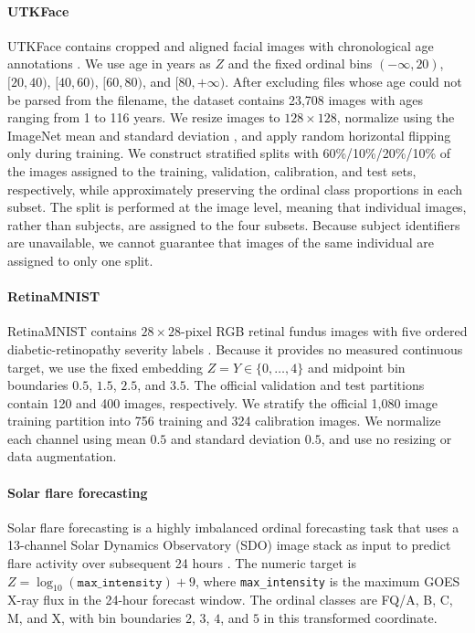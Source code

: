 \documentclass[conference]{IEEEtran}
\begin{document}
\paragraph{UTKFace}
UTKFace contains cropped and aligned facial images with chronological age annotations \cite{utkface-zhifei2017cvpr}. We use age in years as $Z$ and the fixed ordinal bins $(-\infty,20)$, $[20,40)$, $[40,60)$, $[60,80)$, and $[80,+\infty)$. After excluding files whose age could not be parsed from the filename, the dataset contains 23{,}708 images with ages ranging from 1 to 116 years. We resize images to $128\times128$, normalize using the ImageNet mean and standard deviation \cite{deng2009imagenet}, and apply random horizontal flipping only during training. We construct stratified splits with 60\%/10\%/20\%/10\% of the images assigned to the training, validation, calibration, and test sets, respectively, while approximately preserving the ordinal class proportions in each subset. The split is performed at the image level, meaning that individual images, rather than subjects, are assigned to the four subsets. Because subject identifiers are unavailable, we cannot guarantee that images of the same individual are assigned to only one split.

\paragraph{RetinaMNIST}
RetinaMNIST contains \(28\times28\)-pixel RGB retinal fundus images with five ordered diabetic-retinopathy severity labels \cite{medmnistv2}. Because it provides no measured continuous target, we use the fixed embedding $Z=Y\in\{0,\ldots,4\}$ and midpoint bin boundaries $0.5$, $1.5$, $2.5$, and $3.5$. The official validation and test partitions contain 120 and 400 images, respectively. We stratify the official 1{,}080 image training partition into 756 training and 324 calibration images. We normalize each channel using mean \(0.5\) and standard deviation \(0.5\), and use no resizing or data augmentation.

\paragraph{Solar flare forecasting}
Solar flare forecasting is a highly imbalanced ordinal forecasting task that uses a 13-channel Solar Dynamics Observatory (SDO) image stack as input to predict flare activity over subsequent 24 hours \cite{roy2026suryabench}. The numeric target is $Z=\log_{10}(\texttt{max\_intensity})+9$, where \texttt{max\_intensity} is the maximum GOES X-ray flux in the 24-hour forecast window. The ordinal classes are FQ/A, B, C, M, and X, with bin boundaries $2$, $3$, $4$, and $5$ in this transformed coordinate. 
\end{document}
